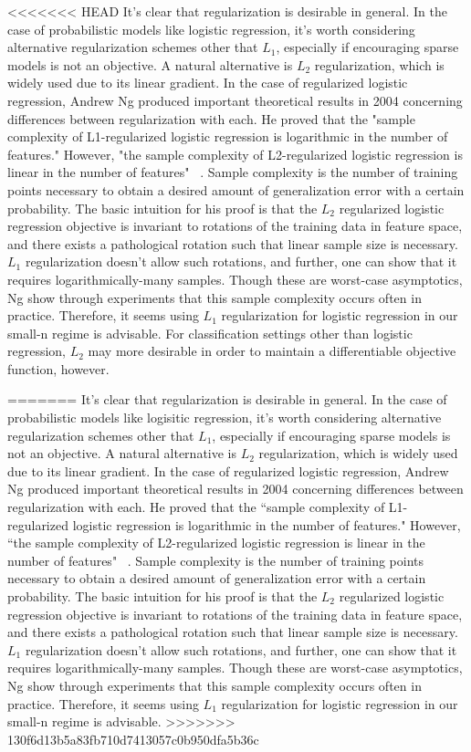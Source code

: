\documentclass[]{article}
\begin{document}
<<<<<<< HEAD
	It's clear that regularization is desirable in general. In the case of probabilistic models like logistic regression, it's worth considering alternative regularization schemes other that $L_1$, especially if encouraging sparse models is not an objective. A natural alternative is $L_2$ regularization, which is widely used due to its linear gradient. In the case of regularized logistic regression, Andrew Ng produced important theoretical results in 2004 concerning differences between regularization with each. He proved that the "sample complexity of L1-regularized logistic regression is logarithmic in the number of features." However,  "the sample complexity of L2-regularized logistic regression is linear in the number of features"  ~\cite{ng2004feature}. Sample complexity is the number of training points necessary to obtain a desired amount of generalization error with a certain probability. The basic intuition for his proof is that the $L_2$ regularized logistic regression objective is invariant to rotations of the training data in feature space, and there exists a pathological rotation such that linear sample size is necessary. $L_1$ regularization doesn't allow such rotations, and further, one can show that it requires logarithmically-many samples. Though these are worst-case asymptotics, Ng show through experiments that  this sample complexity occurs often in practice. Therefore, it seems using $L_1$ regularization for logistic regression in our small-n regime is advisable. For classification settings other than logistic regression, $L_2$ may more desirable in order to maintain a differentiable objective function, however. 
	
=======
	It's clear that regularization is desirable in general. In the case of probabilistic models like logisitic regression, it's worth considering alternative regularization schemes other that $L_1$, especially if encouraging sparse models is not an objective. A natural alternative is $L_2$ regularization, which is widely used due to its linear gradient. In the case of regularized logistic regression, Andrew Ng produced important theoretical results in 2004 concerning differences between regularization with each. He proved that the ``sample complexity of L1-regularized logistic regression is logarithmic in the number of features." However,  ``the sample complexity of L2-regularized logistic regression is linear in the number of features"  ~\cite{ng2004feature}. Sample complexity is the number of training points necessary to obtain a desired amount of generalization error with a certain probability. The basic intuition for his proof is that the $L_2$ regularized logistic regression objective is invariant to rotations of the training data in feature space, and there exists a pathological rotation such that linear sample size is necessary. $L_1$ regularization doesn't allow such rotations, and further, one can show that it requires logarithmically-many samples. Though these are worst-case asymptotics, Ng show through experiments that  this sample complexity occurs often in practice. Therefore, it seems using $L_1$ regularization for logistic regression in our small-n regime is advisable. 
>>>>>>> 130f6d13b5a83fb710d7413057c0b950dfa5b36c
\end{document}
